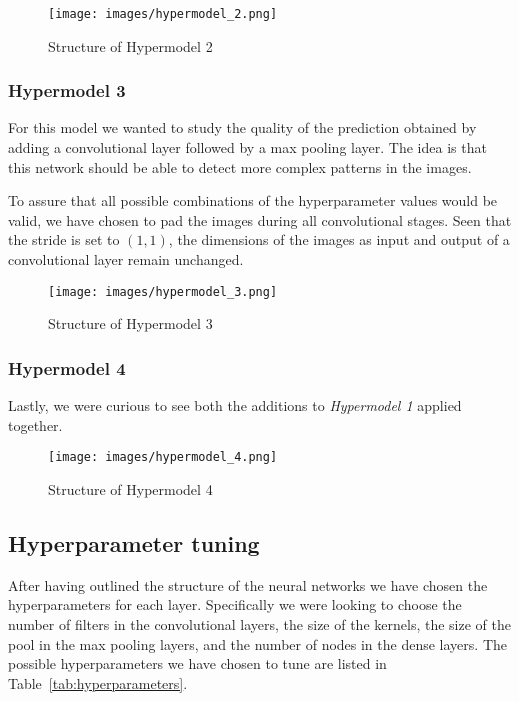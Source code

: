 \begin{figure}[h]
    \label{fig:Hypermodel_2}
    \centering
    \texttt{[image: images/hypermodel\_2.png]}
    \caption{Structure of Hypermodel 2}
\end{figure}

\subsubsection{Hypermodel 3}\label{hypermodel_3}
For this model we wanted to study the quality of the prediction obtained by adding a convolutional layer followed by a max pooling layer. The idea is that this network should be able to detect more complex patterns in the images.

To assure that all possible combinations of the hyperparameter values would be valid, we have chosen to pad the images during all convolutional stages. Seen that the stride is set to $(1,1)$, the dimensions of the images as input and output of a convolutional layer remain unchanged.

\begin{figure}[!]
    \label{fig:Hypermodel_3}
    \centering
    \texttt{[image: images/hypermodel\_3.png]}
    \caption{Structure of Hypermodel 3}
\end{figure}

\subsubsection{Hypermodel 4}\label{hypermodel_4}
Lastly, we were curious to see both the additions to \textsl{Hypermodel 1} applied together.

\begin{figure}[!]
    \label{fig:Hypermodel_4}
    \centering
    \texttt{[image: images/hypermodel\_4.png]}
    \caption{Structure of Hypermodel 4}
\end{figure}

\subsection{Hyperparameter tuning}\label{hyperparameter_tuning}
After having outlined the structure of the neural networks we have chosen the hyperparameters for each layer. Specifically we were looking to choose the number of filters in the convolutional layers, the size of the kernels, the size of the pool in the max pooling layers, and the number of nodes in the dense layers. The possible hyperparameters we have chosen to tune are listed in Table~\ref{tab:hyperparameters}.

